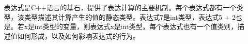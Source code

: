 表达式是C++语言的基石，提供了表达计算的主要机制。每个表达式都有一个类型，该类型描述其计算产生的值的静态类型。表达式7是int类型，表达式5 + 2也是。若x是int类型的变量，则表达式x是int类型。每个表达式也有一个值类别，描述值如何形成，以及如何影响表达式的行为。